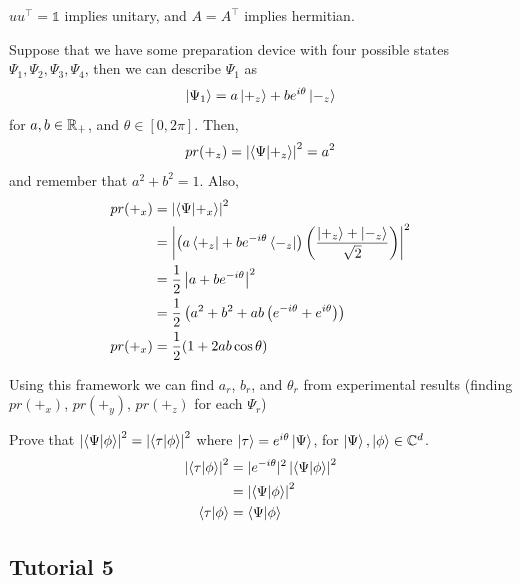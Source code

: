 \documentclass[english, 11pt]{article}
\begin{document}
      \begin{note}
        $uu^\intercal = \mathbb{1}$ implies unitary, and $A = A^\intercal$ implies hermitian.
      \end{note}

      \begin{exmp}
        Suppose that we have some preparation device with four possible states $\Psi_1, \Psi_2, \Psi_3, \Psi_4$, then we can describe $\Psi_1$ as
        \[ \left|\Psi_1\right\rangle = a\left|+_z\right\rangle + be^{i\theta}\left|-_z\right\rangle \]
        for $a, b \in {\mathbb{R}}_+$, and $\theta \in [0, 2\pi]$. Then,
        \[ pr(+_z) = \left|\braket{\Psi}{+_z}\right|^2 = a^2\]
        and remember that $a^2 + b^2 = 1$. Also,
        \begin{align*}
          pr(+_x) & = \left| \braket{\Psi}{+_x} \right|^2 \\
                  & = \left| \left( a \bra{+_z}+be^{-i\theta}\bra{-_z} \right) \left( \f{\ket{+_z} + \ket{-_z}}{\sqrt{2}} \right) \right|^2 \\
                  & = \f{1}{2} \left| a + be^{-i\theta} \right|^2 \\
                  & = \f{1}{2} \left( a^2 + b^2 + ab \left( e^{-i\theta} + e^{i\theta} \right) \right) \\
          pr(+_x) & = \f{1}{2} (1 + 2ab\cos\theta)
        \end{align*}

        Using this framework we can find $a_r$, $b_r$, and $\theta_r$ from experimental results (finding $pr(+_x)$, $pr(+_y)$, $pr(+_z)$ for each $\Psi_r$)
      \end{exmp}

      \begin{exmp}
        Prove that $\left|\braket{\Psi}{\phi}\right|^2 = \left|\braket{\tau}{\phi}\right|^2$ where $\left|\tau\right\rangle = e^{i\theta} \left|\Psi\right\rangle$, for $\left|\Psi\right\rangle, \left|\phi\right\rangle \in {\mathbb{C}}^d$.
        \newline
        \begin{align*}
          \left|\braket{\tau}{\phi}\right|^2 & = |e^{-i\theta}|^2\left|\braket{\Psi}{\phi}\right|^2 \\
          & = \left|\braket{\Psi}{\phi}\right|^2 \\ \braket{\tau}{\phi} & = \braket{\Psi}{\phi}
        \end{align*}
      \end{exmp}

     \subsection{Tutorial 5}
\end{document}
